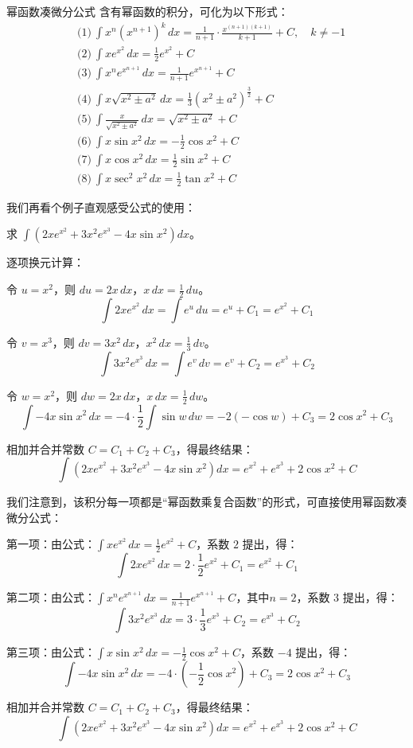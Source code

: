 \begin{theorem}{幂函数凑微分公式}{}
  含有幂函数的积分，可化为以下形式：
\[
\begin{aligned}
&\text{(1)}\ \int x^n (x^{n+1})^k \,dx = \frac{1}{n+1}\cdot\frac{x^{(n+1)(k+1)}}{k+1}+C, \quad k\neq -1 \\[4pt]
&\text{(2)}\ \int x e^{x^2} \,dx = \frac{1}{2}e^{x^2}+C \\[4pt]
&\text{(3)}\ \int x^n e^{x^{n+1}} \,dx = \frac{1}{n+1}e^{x^{n+1}}+C \\[4pt]
&\text{(4)}\ \int x\sqrt{x^2\pm a^2} \,dx = \frac{1}{3}(x^2\pm a^2)^{\frac{3}{2}}+C \\[4pt]
&\text{(5)}\ \int \frac{x}{\sqrt{x^2\pm a^2}} \,dx = \sqrt{x^2\pm a^2}+C \\[4pt]
&\text{(6)}\ \int x\sin x^2 \,dx = -\frac{1}{2}\cos x^2+C \\[4pt]
&\text{(7)}\ \int x\cos x^2 \,dx = \frac{1}{2}\sin x^2+C \\[4pt]
&\text{(8)}\ \int x\sec^2 x^2 \,dx = \frac{1}{2}\tan x^2+C
\end{aligned}
\]
\end{theorem}

我们再看个例子直观感受公式的使用：

\begin{myexample}
  求 $\int ( 2x e^{x^2} + 3x^2 e^{x^3} - 4x \sin x^2 ) dx$。

    逐项换元计算：

令 $u = x^2$，则 $du = 2x\,dx$，$x\,dx = \frac{1}{2}\,du$。
    \[
    \int 2x e^{x^2}\,dx = \int e^{u}\,du = e^{u} + C_1 = e^{x^2} + C_1
    \]

令 $v = x^3$，则 $dv = 3x^2\,dx$，$x^2\,dx = \frac{1}{3}\,dv$。
    \[
    \int 3x^2 e^{x^3}\,dx = \int e^{v}\,dv = e^{v} + C_2 = e^{x^3} + C_2
    \]

令 $w = x^2$，则 $dw = 2x\,dx$，$x\,dx = \frac{1}{2}\,dw$。
    \[
    \int -4x \sin x^2\,dx = -4\cdot\frac{1}{2}\int \sin w\,dw = -2(-\cos w) + C_3 = 2\cos x^2 + C_3
    \]

  相加并合并常数 $C = C_1+C_2+C_3$，得最终结果：
  \[
  \int ( 2x e^{x^2} + 3x^2 e^{x^3} - 4x \sin x^2 ) dx
  = e^{x^2} + e^{x^3} + 2\cos x^2 + C
  \]

  我们注意到，该积分每一项都是“幂函数乘复合函数”的形式，可直接使用幂函数凑微分公式：

第一项：由公式：$\int x e^{x^2}\,dx = \frac{1}{2}e^{x^2}+C$，系数 $2$ 提出，得：
    \[
    \int 2x e^{x^2}\,dx = 2\cdot\frac{1}{2}e^{x^2}+C_1 = e^{x^2}+C_1
    \]

第二项：由公式：$\int x^n e^{x^{n+1}}\,dx = \frac{1}{n+1}e^{x^{n+1}}+C$，其中$n=2$，系数 $3$ 提出，得：
    \[
    \int 3x^2 e^{x^3}\,dx = 3\cdot\frac{1}{3}e^{x^3}+C_2 = e^{x^3}+C_2
    \]

第三项：由公式：$\int x \sin x^2\,dx = -\frac{1}{2}\cos x^2+C$，系数 $-4$ 提出，得：
    \[
    \int -4x \sin x^2\,dx = -4\cdot(-\frac{1}{2}\cos x^2)+C_3 = 2\cos x^2+C_3
    \]

  相加并合并常数 $C = C_1+C_2+C_3$，得最终结果：
  \[
  \int ( 2x e^{x^2} + 3x^2 e^{x^3} - 4x \sin x^2 ) dx
  = e^{x^2} + e^{x^3} + 2\cos x^2 + C
  \]
\end{myexample}

